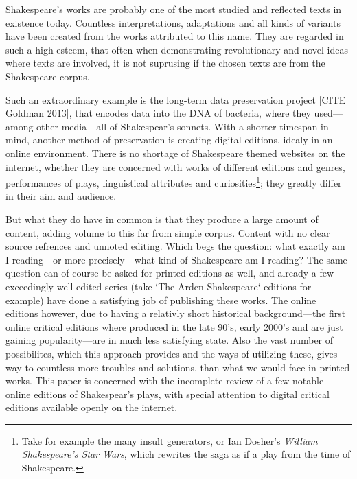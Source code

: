 
Shakespeare's works are probably one of the most studied and reflected texts in existence today. Countless interpretations, adaptations and all kinds of variants have been created from the works attributed to this name. They are regarded in such a high esteem, that often when demonstrating revolutionary and novel ideas where texts are involved, it is not suprusing if the chosen texts are from the Shakespeare corpus. 

Such an extraordinary example is the long-term data preservation project [CITE Goldman 2013], that encodes data into the DNA of bacteria, where they used---among other media---all of Shakespear's sonnets. With a shorter timespan in mind, another method of preservation is creating digital editions, idealy in an online environment. There is no shortage of Shakespeare themed websites on the internet, whether they are concerned with works of different editions and genres, performances of plays, linguistical attributes and curiosities\footnote{Take for example the many insult generators, or Ian Dosher's \textit{William Shakespeare's Star Wars}, which rewrites the saga as if a play from the time of Shakespeare.}; they greatly differ in their aim and audience. 

But what they do have in common is that they produce a large amount of content, adding volume to this far from simple corpus. Content with no clear source refrences and unnoted editing. Which begs the question: what exactly am I reading---or more precisely---what kind of Shakespeare am I reading? The same question can of course be asked for printed editions as well, and already a few exceedingly well edited series (take `The Arden Shakespeare` editions for example) have done a satisfying job of publishing these works. The online editions however, due to having a relativly short historical background---the first online critical editions where produced in the late 90's, early 2000's and are just gaining popularity---are in much less satisfying state. Also the vast number of possibilites, which this approach provides and the ways of utilizing these, gives way to countless more troubles and solutions, than what we would face in printed works. This paper is concerned with the incomplete review of a few notable online editions of Shakespear's plays, with special attention to digital critical editions available openly on the internet.

